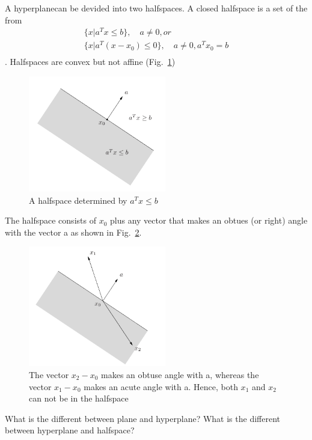 \documentclass[12pt]{article}%
\begin{document}
A hyperplanecan be devided into two halfspaces. A closed halfspace is a set of the from
\begin{equation}
    \begin{aligned}
     \{x | a^Tx \leq b\}, \quad a \neq 0, or\\
      \{x | a^T(x-x_0) \leq 0\}, \quad a \neq 0, a^Tx_0 = b\\
     \end{aligned}
\end{equation}. Halfspaces are convex but not affine (Fig.~\ref{f:hyperplane_2})

\begin{figure}[H]
    \begin{center}
    \includegraphics[width=6cm]{hyperplane_2.png}
    \caption{A halfspace determined by $a^Tx \leq b$ ~\cite{boyd2004convex}}\label{f:hyperplane_2}
    \end{center}
\end{figure} The halfspace consists of $x_0$ plus any vector that makes an obtues (or right) angle with the vector a as shown in Fig.~\ref{f:hyperplane_3}.
\begin{figure}[H]
    \begin{center}
    \includegraphics[width=6cm]{hyperplane_3.png}
    \caption{The vector $x_2-x_0$ makes an obtuse angle with a, whereas the vector $x_1-x_0$ makes an acute angle with a. Hence, both $x_1$ and $x_2$ can not be in the halfspace ~\cite{boyd2004convex}}\label{f:hyperplane_3}
    \end{center}
\end{figure}
What is the different between plane and hyperplane? What is the different between hyperplane and halfspace? 
\end{document}
